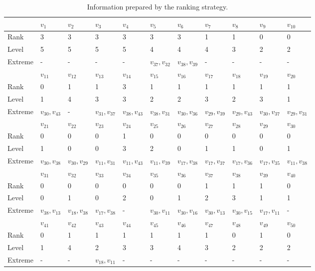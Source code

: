 \documentclass[a4paper,UKenglish]{lipics-v2018}
\theoremstyle{definition}
\begin{document}
\begin{table}[h!]
  \centering
  \begin{tabular}{  l | l | l | l| l| l| l| l| l|l|l }
     & $v_1$ & $v_2$ & $v_3$ & $v_4$ & $v_5$ & $v_6$ & $v_7$ & $v_8$ & $v_9$ & $v_{10}$\\
     \hline
    Rank &  3  &  3 &  3 &  3 & 3  & 3  & 1  &  1 & 0  & 0  \\
    Level &  5  & 5  & 5  &  5 & 4  & 4  & 4  & 3  & 2  & 2  \\
    Extreme  &  -  & -  &  - & -  & $v_{37},v_{32} $ & $v_{38},v_{39} $ & - & -  &  - & -   \\
    \hline
    & $v_{11}$ & $v_{12}$ & $v_{13}$ & $v_{14}$ & $v_{15}$ & $v_{16}$ & $v_{17}$ & $v_{18}$ & $v_{19}$ & $v_{20}$\\
     \hline
    Rank &   0 & 1  & 1  & 3  &  1 & 1  &  1 & 1  & 1  & 1  \\
    Level &   1 &  4 & 3  & 3  & 2  & 2  &  3 & 2  &  3 & 1  \\
    Extreme  &  $v_{30},v_{43}$  & -  & $v_{31},v_{37}$  & $v_{38},v_{43}$  & $v_{38},v_{31}$  & $v_{30},v_{36}$  & $v_{29},v_{39}$  & $v_{29},v_{43}$  & $v_{30},v_{37}$  & $v_{29},v_{31}$  \\
    \hline
    & $v_{21}$ & $v_{22}$ & $v_{23}$ & $v_{24}$ & $v_{25}$ & $v_{26}$ & $v_{27}$ & $v_{28}$ & $v_{29}$ & $v_{30}$\\
     \hline
    Rank &  0  &  0 &  0 & 1  & 0  & 0  & 0  & 0  & 0  & 0  \\
    Level &  1  & 0  &  0 & 3  &  2 &  0 & 1  & 1  & 0  & 1  \\
    Extreme  &  $v_{30},v_{38}$  & $v_{30},v_{29}$  & $v_{11},v_{31}$  & $v_{11},v_{43}$  & $v_{11},v_{39}$  & $v_{17},v_{38}$  & $v_{17},v_{37}$  & $v_{17},v_{36}$  & $v_{17},v_{35}$  & $v_{11},v_{38}$  \\
    \hline
    & $v_{31}$ & $v_{32}$ & $v_{33}$ & $v_{34}$ & $v_{35}$ & $v_{36}$ & $v_{37}$ & $v_{38}$ & $v_{39}$ & $v_{40}$\\
     \hline
    Rank &  0  & 0  & 0  &  0 & 0  & 0  &  1 &1   &  1 & 0  \\
    Level &  0  &  1 &  0 &  2 &  0 & 1  & 2  & 3  & 1  &  1 \\
    Extreme  &  $v_{38},v_{13}$  & $v_{18},v_{38}$  & $v_{17},v_{38}$  & -  & $v_{30},v_{11}$  & $v_{30},v_{16}$  & $v_{30},v_{13}$  & $v_{30},v_{15}$  &  $v_{17},v_{11}$ &  - \\
    \hline
    & $v_{41}$ & $v_{42}$ & $v_{43}$ & $v_{44}$ & $v_{45}$ & $v_{46}$ & $v_{47}$ & $v_{48}$ & $v_{49}$ & $v_{50}$\\
     \hline
    Rank &  0  & 1  &  1 & 1  &  1 &  1 &  1 &  0 & 1  &  0 \\
    Level &  1  & 4  &  2 &  3 & 3  & 4  & 3  &  2 & 2  &  2 \\
    Extreme  &  -  & -  & $v_{18},v_{11}$  & -  & -  &  - & -  & -  &  - & -  \\
  \end{tabular}~\label{our-table}
  \caption{Information prepared by the ranking strategy. }
\label{our-table}
\end{table}
\end{document}
